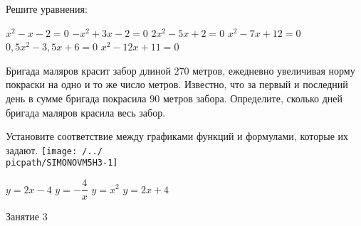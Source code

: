 \begin{homework}[number=2]
	\begin{listofex}
		\item Решите уравнения:
		\begin{tasks}
			\task \( x^2-x-2=0 \)
			\task \( -x^2+3x-2=0 \)
			\task \( 2x^2-5x+2=0 \)
			\task \( x^2-7x+12=0 \)
			\task \( 0,5x^2-3,5x+6=0 \)
			\task \( x^2-12x+11=0 \)
		\end{tasks}
		\item  Бригада маляров красит забор длиной \(270\) метров, ежедневно увеличивая норму покраски на одно и то же число метров. Известно, что за первый и последний день в сумме бригада покрасила \(90\) метров забора. Определите, сколько дней бригада маляров красила весь забор.
		\item Установите соответствие между графиками функций и формулами, которые их задают.
		\texttt{[image: /../\\picpath/SIMONOVM5H3-1]}
		\begin{tasks}
			\task \(y=2x-4\)
			\task \(y=-\dfrac{4}{x}\)
			\task \(y=x^2\)
			\task \(y=2x+4\)
		\end{tasks}
	\end{listofex}
\end{homework}

\begin{class}[number=3]
	\begin{listofex}
		\item Занятие 3
	\end{listofex}
\end{class}

